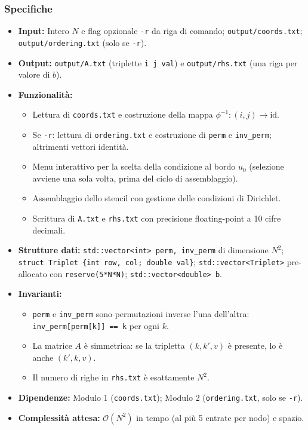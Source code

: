 \documentclass[a4paper,12pt]{article}
\begin{document}
\subsubsection*{Specifiche}

\begin{itemize}
  \item \textbf{Input:} Intero $N$ e flag opzionale \texttt{-r} da riga di comando; \texttt{output/coords.txt}; \texttt{output/ordering.txt} (solo se \texttt{-r}).
  \item \textbf{Output:} \texttt{output/A.txt} (triplette \texttt{i j val}) e \texttt{output/rhs.txt} (una riga per valore di $b$).
  \item \textbf{Funzionalità:}
    \begin{itemize}
      \item Lettura di \texttt{coords.txt} e costruzione della mappa $\phi^{-1}: (i,j) \to \text{id}$.
      \item Se \texttt{-r}: lettura di \texttt{ordering.txt} e costruzione di \texttt{perm} e \texttt{inv\_perm}; altrimenti vettori identità.
      \item Menu interattivo per la scelta della condizione al bordo $u_0$ (selezione avviene una sola volta, prima del ciclo di assemblaggio).
      \item Assemblaggio dello stencil con gestione delle condizioni di Dirichlet.
      \item Scrittura di \texttt{A.txt} e \texttt{rhs.txt} con precisione floating-point a 10 cifre decimali.
    \end{itemize}
  \item \textbf{Strutture dati:} \texttt{std::vector<int> perm, inv\_perm} di dimensione $N^2$; \texttt{struct Triplet \{int row, col; double val\}}; \texttt{std::vector<Triplet>} pre-allocato con \texttt{reserve(5*N*N)}; \texttt{std::vector<double> b}.
  \item \textbf{Invarianti:}
    \begin{itemize}
      \item \texttt{perm} e \texttt{inv\_perm} sono permutazioni inverse l'una dell'altra: \texttt{inv\_perm[perm[k]] == k} per ogni $k$.
      \item La matrice $A$ è simmetrica: se la tripletta $(k, k', v)$ è presente, lo è anche $(k', k, v)$.
      \item Il numero di righe in \texttt{rhs.txt} è esattamente $N^2$.
    \end{itemize}
  \item \textbf{Dipendenze:} Modulo 1 (\texttt{coords.txt}); Modulo 2 (\texttt{ordering.txt}, solo se \texttt{-r}).
  \item \textbf{Complessità attesa:} $\mathcal{O}(N^2)$ in tempo (al più 5 entrate per nodo) e spazio.
\end{itemize}
\end{document}
